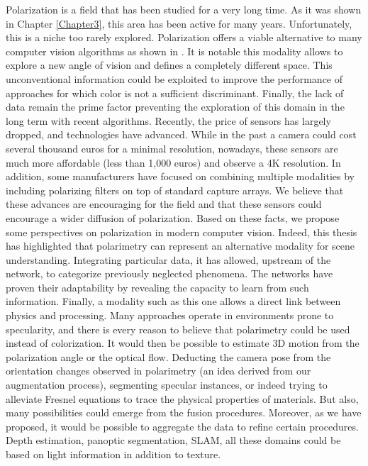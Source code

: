 Polarization is a field that has been studied for a very long time. As it was shown in Chapter \ref{Chapter3}, this area has been active for many years. Unfortunately, this is a niche too rarely explored.
Polarization offers a viable alternative to many computer vision algorithms as shown in \cite{morel2005polarization,morel2006active,morel2007catadioptric,cui2017polarimetric,berger2017depth,rastgoo2018attitude,blin2019road,blin2019adapted,blin2020new}.
It is notable this modality allows to explore a new angle of vision and defines a completely different space. This unconventional information could be exploited to improve the performance of approaches for which color is not a sufficient discriminant. Finally, the lack of data remain the prime factor preventing the exploration of this domain in the long term with recent algorithms.
Recently, the price of sensors has largely dropped, and technologies have advanced. While in the past a camera could cost several thousand euros for a minimal resolution, nowadays, these sensors are much more affordable (less than 1,000 euros) and observe a 4K resolution. In addition, some manufacturers have focused on combining multiple modalities by including polarizing filters on top of standard capture arrays. We believe that these advances are encouraging for the field and that these sensors could encourage a wider diffusion of polarization. 
Based on these facts, we propose some perspectives on polarization in modern computer vision.
Indeed, this thesis has highlighted that polarimetry can represent an alternative modality for scene understanding. Integrating particular data, it has allowed, upstream of the network, to categorize previously neglected phenomena. The networks have proven their adaptability by revealing the capacity to learn from such information. Finally, a modality such as this one allows a direct link between physics and processing. Many approaches operate in environments prone to specularity, and there is every reason to believe that polarimetry could be used instead of colorization. It would then be possible to estimate 3D motion from the polarization angle or the optical flow. Deducting the camera pose from the orientation changes observed in polarimetry (an idea derived from our augmentation process), segmenting specular instances, or indeed trying to alleviate Fresnel equations to trace the physical properties of materials. But also, many possibilities could emerge from the fusion procedures. Moreover, as we have proposed, it would be possible to aggregate the data to refine certain procedures. Depth estimation, panoptic segmentation, SLAM, all these domains could be based on light information in addition to texture. 

